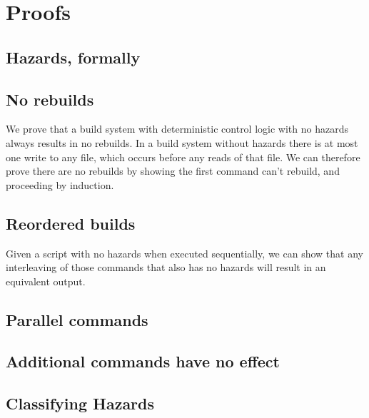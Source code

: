 \section{Proofs}
\label{sec:proof}

\subsection{Hazards, formally}

\subsection{No rebuilds}
\label{sec:proof:no_rebuild}

We prove that a build system with deterministic control logic with no hazards always results in no rebuilds.
In a build system without hazards there is at most one write to any file, which occurs before any reads of that file. We can therefore prove there are no rebuilds by showing the first command can't rebuild, and proceeding by induction.

\subsection{Reordered builds}
\label{sec:proof:reorder}

Given a script with no hazards when executed sequentially, we can show that any interleaving of those commands that also has no hazards will result in an equivalent output.

\subsection{Parallel commands}
\label{sec:proof:parallel}

\subsection{Additional commands have no effect}
\label{sec:proof:additional}

\subsection{Classifying Hazards}
\label{sec:proof:classify_hazard}
